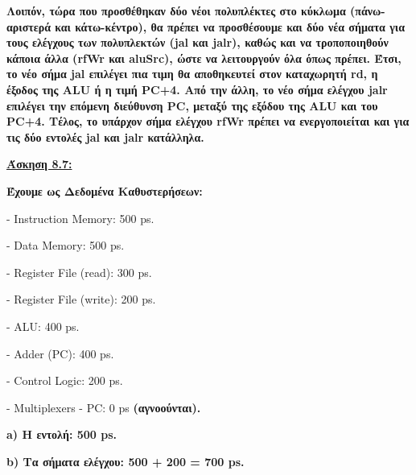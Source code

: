\documentclass{article}
\begin{document}
\vspace{1.0cm}
\textbf{Λοιπόν, τώρα που προσθέθηκαν δύο νέοι πολυπλέκτες στο κύκλωμα (πάνω-αριστερά και κάτω-κέντρο), θα πρέπει να προσθέσουμε και δύο νέα σήματα για τους ελέγχους των πολυπλεκτών (\textlatin{jal} και \textlatin{jalr}), καθώς και να τροποποιηθούν κάποια άλλα (\textlatin{rfWr} και \textlatin{aluSrc}), ώστε να λειτουργούν όλα όπως πρέπει. Έτσι, το νέο σήμα \textlatin{jal} επιλέγει πια τιμη θα αποθηκευτεί στον καταχωρητή \textlatin{rd}, η έξοδος της \textlatin{ALU} ή η τιμή \textlatin{PC+4}. Από την άλλη, το νέο σήμα ελέγχου \textlatin{jalr} επιλέγει την επόμενη διεύθυνση \textlatin{PC}, μεταξύ της εξόδου της \textlatin{ALU} και του \textlatin{PC+4}. Τέλος, το υπάρχον σήμα ελέγχου \textlatin{rfWr} πρέπει να ενεργοποιείται και για τις δύο εντολές \textlatin{jal} και \textlatin{jalr} κατάλληλα.}



\newpage
\underline{\textbf{Άσκηση 8.7:}}
\vspace{1.35cm}


\textbf{Έχουμε ως Δεδομένα Καθυστερήσεων:}
\vspace{0.1cm}

\textlatin{- Instruction Memory: 500 ps.}
\vspace{0.1cm}

\textlatin{- Data Memory: 500 ps.}
\vspace{0.1cm}

\textlatin{- Register File (read): 300 ps.}
\vspace{0.1cm}

\textlatin{- Register File (write): 200 ps.}
\vspace{0.1cm}

\textlatin{- ALU: 400 ps.}
\vspace{0.1cm}

\textlatin{- Adder (PC): 400 ps.}
\vspace{0.1cm}

\textlatin{- Control Logic: 200 ps.}
\vspace{0.1cm}

\textlatin{- Multiplexers - PC: 0 ps} \textbf{ (αγνοούνται).}
\vspace{0.75cm}

\textbf{\textlatin{a}) Η εντολή: \textlatin{500 ps.}}

\vspace{0.1cm}
\textbf{\textlatin{b}) Τα σήματα ελέγχου: \textlatin{500 + 200 = 700 ps.}}
\end{document}
